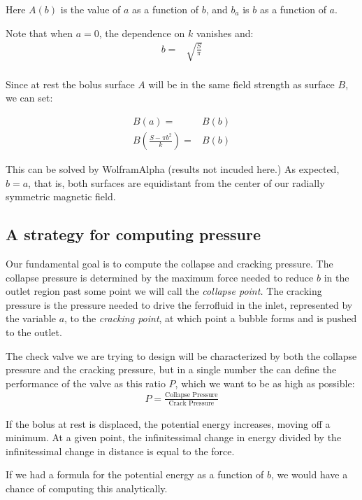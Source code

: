 \documentclass{asme2ej}
\begin{document}
Here $A(b)$ is the value of $a$ as a function of $b$, and $b_a$ is $b$ as a function of $a$.

Note that when $a = 0$, the dependence on $k$ vanishes and:
\begin{align}
  b = & \sqrt{\frac{S}{\pi}} \\
  \label{eq:maximalB}
\end{align}

Since at rest the bolus surface $A$ will be in the same field strength as surface $B$, we can set:

\begin{align}
  B(a) = & B(b) \\
  B(\frac{S - \pi b^2 }{k}) = & B(b)
\end{align}


This can be solved by WolframAlpha (results not incuded here.)
As expected, $ b = a $, that is, both surfaces are equidistant from the
center of our radially symmetric magnetic field.

\subsection{A strategy for computing pressure}

Our fundamental goal is to compute the collapse and cracking
pressure. The collapse pressure is determined by the maximum force needed
to reduce $b$ in the outlet region past some point we will call the
{\em collapse point.}
The cracking pressure is the pressure needed to drive the ferrofluid in the inlet,
represented
by the variable $a$, to the {\em cracking point}, at which point
a bubble forms and is pushed to the outlet.

The check valve we are trying to design will be characterized by
both the collapse pressure and the cracking pressure, but in a single
number the can define the performance of the valve as this ratio $P$,
which we want to be as high as possible:
\begin{align}
  P = \frac{\text{Collapse Pressure}}{\text{Crack Pressure}}
  \end{align}

If the bolus at rest is displaced, the potential energy increases,
moving off a minimum. At a given point, the infinitessimal change
in energy divided by the infinitessimal change in distance
is equal to the force.

If we had a formula for the potential energy as a function of $b$,
we would have a chance of computing this analytically.
\end{document}

